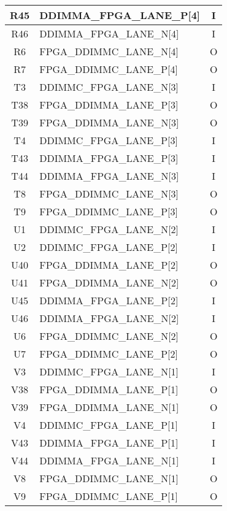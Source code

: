 \begin{longtable}[l]{| c | l | c |}
  R45  & DDIMMA\_FPGA\_LANE\_P[4]     & I   \\ \hline
  R46  & DDIMMA\_FPGA\_LANE\_N[4]     & I   \\ \hline
  R6   & FPGA\_DDIMMC\_LANE\_N[4]     & O   \\ \hline
  R7   & FPGA\_DDIMMC\_LANE\_P[4]     & O   \\ \hline
  T3   & DDIMMC\_FPGA\_LANE\_N[3]     & I   \\ \hline
  T38  & FPGA\_DDIMMA\_LANE\_P[3]     & O   \\ \hline
  T39  & FPGA\_DDIMMA\_LANE\_N[3]     & O   \\ \hline
  T4   & DDIMMC\_FPGA\_LANE\_P[3]     & I   \\ \hline
  T43  & DDIMMA\_FPGA\_LANE\_P[3]     & I   \\ \hline
  T44  & DDIMMA\_FPGA\_LANE\_N[3]     & I   \\ \hline
  T8   & FPGA\_DDIMMC\_LANE\_N[3]     & O   \\ \hline
  T9   & FPGA\_DDIMMC\_LANE\_P[3]     & O   \\ \hline
  U1   & DDIMMC\_FPGA\_LANE\_N[2]     & I   \\ \hline
  U2   & DDIMMC\_FPGA\_LANE\_P[2]     & I   \\ \hline
  U40  & FPGA\_DDIMMA\_LANE\_P[2]     & O   \\ \hline
  U41  & FPGA\_DDIMMA\_LANE\_N[2]     & O   \\ \hline
  U45  & DDIMMA\_FPGA\_LANE\_P[2]     & I   \\ \hline
  U46  & DDIMMA\_FPGA\_LANE\_N[2]     & I   \\ \hline
  U6   & FPGA\_DDIMMC\_LANE\_N[2]     & O   \\ \hline
  U7   & FPGA\_DDIMMC\_LANE\_P[2]     & O   \\ \hline
  V3   & DDIMMC\_FPGA\_LANE\_N[1]     & I   \\ \hline
  V38  & FPGA\_DDIMMA\_LANE\_P[1]     & O   \\ \hline
  V39  & FPGA\_DDIMMA\_LANE\_N[1]     & O   \\ \hline
  V4   & DDIMMC\_FPGA\_LANE\_P[1]     & I   \\ \hline
  V43  & DDIMMA\_FPGA\_LANE\_P[1]     & I   \\ \hline
  V44  & DDIMMA\_FPGA\_LANE\_N[1]     & I   \\ \hline
  V8   & FPGA\_DDIMMC\_LANE\_N[1]     & O   \\ \hline
  V9   & FPGA\_DDIMMC\_LANE\_P[1]     & O   \\ \hline

\end{longtable}
